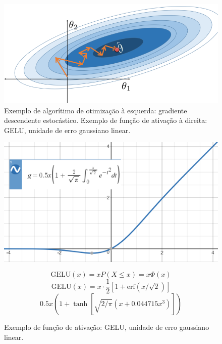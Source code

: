 \begin{figure}[!ht]
    \centering
    \begin{minipage}[c]{\textwidth}
        \includegraphics[width=0.47\columnwidth]{
            Imagens/stochastic_gradient_descent.PNG
        }
    \end{minipage}%
    \begin{minipage}{0.5\textwidth}

                
    \end{minipage} 

    \caption{Exemplo de algorítimo de otimização à esquerda: gradiente descendente estocástico. Exemplo de função de ativação à direita: GELU, unidade de erro gaussiano linear.}
    \label{fig:SGD}
\end{figure}

\begin{figure}[!ht]
    \centering
    \begin{minipage}[c]{0.5\textwidth}
        \includegraphics[width=\columnwidth]{
            Imagens/GELU.PNG
        }
    \end{minipage}%
    \begin{minipage}{0.5\textwidth}
        \begin{equation}
            \text{GELU}\left(x\right) = x{P}\left(X\leq{x}\right) = 
            x\Phi\left(x\right)
        \end{equation}
        \begin{equation}
            \text{GELU}\left(x\right) = x \cdot \frac{1}{2}\left[1 + \text{erf}(x/\sqrt{2})\right]
        \end{equation}
        \begin{equation}
            0.5x\left(1+\tanh\left[\sqrt{2/\pi}\left(x + 0.044715x^{3}\right)\right]\right)
        \end{equation}
                
    \end{minipage} 

    \caption{Exemplo de função de ativação: GELU, unidade de erro gaussiano linear.}
    \label{fig:SGD_GELU}
\end{figure}



